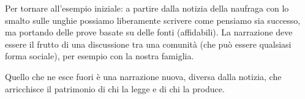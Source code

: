 \documentclass{article}
\begin{document}
Per tornare all’esempio iniziale: a partire dalla notizia della naufraga con lo smalto sulle unghie possiamo liberamente scrivere come pensiamo sia successo, ma portando delle prove basate su delle fonti (affidabili). La narrazione deve essere il frutto di una discussione tra una comunità (che può essere qualsiasi forma sociale), per esempio con la nostra famiglia.

Quello che ne esce fuori è una narrazione nuova, diversa dalla notizia, che arricchisce il patrimonio di chi la legge e di chi la produce.

\nocite{quattrociocchi_liberi_2018}

\printbibliography[heading=bibintoc]
\end{document}
